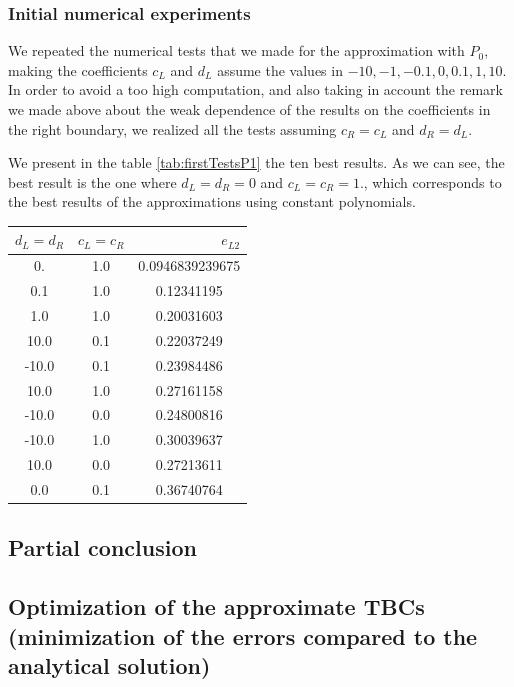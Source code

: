 \subsubsection{Initial numerical experiments}

\indent We repeated the numerical tests that we made for the approximation with $P_0$, making the coefficients $c_L$ and $d_L$ assume the values in ${-10,-1,-0.1,0,0.1,1,10}$. In order to avoid a too high computation, and also taking in account the remark we made above about the weak dependence of the results on the coefficients in the right boundary, we realized all the tests assuming $c_R = c_L$ and $d_R = d_L$.

\indent We present in the table \ref{tab:firstTestsP1} the ten best results. As we can see, the best result is the one where $d_L = d_R = 0$ and $c_L = c_R = 1. $, which corresponds to the best results of the approximations using constant polynomials.

\begin{center}
\begin{tabular}{c|c|S[round-precision=4,table-number-alignment =  left]}
	  &  &  \\
	. & 1.0 & 0.0946839239675 \\
	0.1 & 1.0 & 0.12341195 \\
	1.0 & 1.0 & 0.20031603 \\
	10.0 & 0.1 & 0.22037249 \\
	-10.0 & 0.1 & 0.23984486 \\
	10.0 & 1.0 & 0.27161158 \\
	-10.0 &  0.0 & 0.24800816\\
	-10.0 & 1.0 & 0.30039637 \\
	10.0 & 0.0 & 0.27213611 \\
	0.0 & 0.1 & 0.36740764
\end{tabular}
\end{center}

\subsection{Partial conclusion}

\indent 


\subsection{Optimization of the approximate TBCs (minimization of the errors compared to the analytical solution)}

